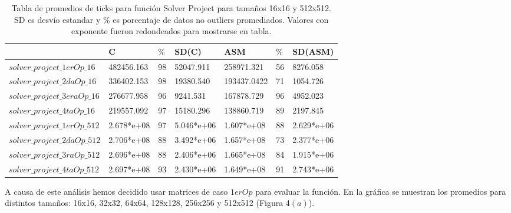 \begin{table}[htbp]
\begin{center}
\begin{tabular}{|l|l|l|l|l|l|l|}
\hline
  & C & $\%$ &  SD(C)  & ASM & $\%$  & SD(ASM)\\
\hline \hline

$solver\_project\_1erOp\_16$ & 482456.163 & 98 & 52047.911 & 258971.321 & 56 & 8276.058\\ \hline
$solver\_project\_2daOp\_16$ & 336402.153 & 98 &  19380.540  & 193437.0422 & 71 & 1054.726\\ \hline
 

$solver\_project\_3eraOp\_16$ & 276677.958 & 96 & 9241.531 & 167878.729 & 96 & 4952.023\\ \hline

$solver\_project\_4taOp\_16$ & 219557.092 & 97 &  15180.296     & 138860.719 & 89 &  2197.845\\ \hline
\hline \hline
$solver\_project\_1erOp\_512$ & 2.678*e+08 & 97 &  5.046*e+06    &  1.607*e+08 & 88 &  2.629*e+06\\ \hline
 
$solver\_project\_2daOp\_512$ &2.706*e+08  & 88 &  3.492*e+06 &   1.657*e+08 & 73 &   2.377*e+06\\ \hline


$solver\_project\_3raOp\_512$ & 2.696*e+08 & 88 &   2.406*e+06   & 1.665*e+08 & 84 & 1.915*e+06\\ \hline

$solver\_project\_4taOp\_512$ & 2.697*e+08 & 93 &  2.430*e+06  &  1.649*e+08 &  91 &    2.743*e+06\\ \hline

\end{tabular}
\caption{Tabla de promedios de ticks para función Solver Project para tamaños 16x16 y 512x512. SD es desvío estandar y $\%$ es porcentaje de datos no outliers promediados. Valores con exponente fueron redondeados para mostrarse en tabla.}
\end{center}
\end{table}
A causa de este análisis hemos decidido usar matrices de caso $1erOp$ para evaluar la función. En la gráfica se muestran los promedios para distintos tamaños: 16x16, 32x32, 64x64, 128x128, 256x256 y 512x512 (Figura 4$(a)$).



